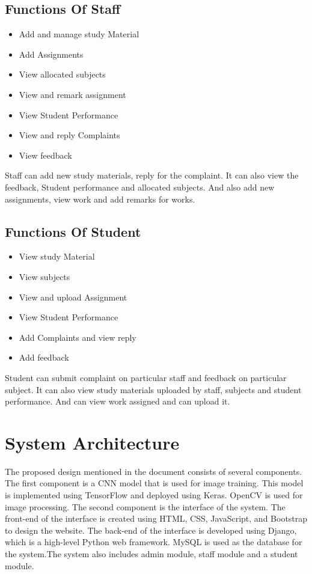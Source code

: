 \subsection{Functions Of Staff}
\begin{itemize}
    \item Add and manage study Material 
    \item Add Assignments
    \item View allocated subjects 
    \item View and remark assignment
    \item View Student Performance
    \item View and reply Complaints 
    \item View feedback
\end{itemize}
\par Staff can add new study materials, reply for the complaint. It can also view the feedback, Student performance and allocated subjects. And also add new assignments, view work and add remarks for works.

\subsection{Functions Of Student}
\begin{itemize}
    \item View study Material 
    \item View subjects 
    \item View and upload Assignment
    \item View Student Performance
    \item Add Complaints and view reply
    \item Add feedback
\end{itemize}
\par Student can submit complaint on particular staff and feedback on particular subject. It can also view study materials uploaded by staff, subjects and student performance. And can view work assigned and can upload it.


\section{System Architecture}
\par \hspace{1cm}The proposed design mentioned in the document consists of several components. The first component is a CNN model that is used for image training. This model is implemented using TensorFlow and deployed using Keras. OpenCV is used for image processing.
The second component is the interface of the system. The front-end of the interface is created using HTML, CSS, JavaScript, and Bootstrap to design the website. The back-end of the interface is developed using Django, which is a high-level Python web framework. MySQL is used as the database for the system.The system also includes admin module, staff module and a student module. 


